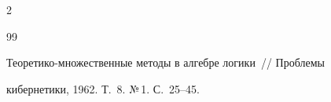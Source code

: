 \begin{multicols}{2}
{{\begin{thebibliography}{99}



  \label{end\stat}





Теоретико-множественные методы в алгебре логики~//  Проблемы 

кибернетики, 1962. Т.~8. №\,1. С.~25--45.



 \end{thebibliography}

}

}



\end{multicols}

